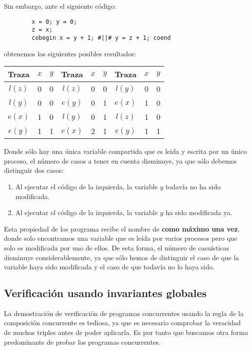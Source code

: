 \begin{ejemplo}
    Sin embargo, ante el siguiente código:
    \begin{verbatim}
        x = 0; y = 0;
        z = x;
        cobegin x = y + 1; #||# y = z + 1; coend
    \end{verbatim}
    obtenemos los siguientes posibles resultados:
    \begin{table}[H]
    \centering
    \begin{tabular}{|c|c|c||c|c|c||c|c|c|}
        \hline
        Traza & $x$ & $y$ &Traza & $x$ & $y$ &Traza & $x$ & $y$ \\
        \hline
        $l(z)$ & 0 & 0 & $l(z)$ & 0 & 0 & $l(y)$ & 0 & 0      \\
        \hline                                                        
        $l(y)$ & 0 & 0 & $e(y)$ & 0 & 1 & $e(x)$ & 1 & 0  \\
        \hline                                                            
        $e(x)$ & 1 & 0 & $l(y)$ & 0 & 1 & $l(z)$ & 1 & 0      \\
        \hline                                                            
        $e(y)$ & 1 & 1 & $e(x)$ & 2 & 1 & $e(y)$ & 1 & 1  \\
        \hline
    \end{tabular}
    \end{table}
    Donde sólo hay una única variable compartida que es leida y escrita por un único proceso, el número de casos a tener en cuenta disminuye, ya que sólo debemos distinguir dos casos:
    \begin{enumerate}
        \item Al ejecutar el código de la izquierda, la variable $y$ todavía no ha sido modificada.
        \item Al ejecutar el código de la izquierda, la variable $y$ ha sido modificada ya.
    \end{enumerate}
    Esta propiedad de los programa recibe el nombre de \textbf{como máximo una vez}, donde solo encontramos una variable que es leída por varios procesos pero que solo es modificada por uno de ellos. De esta forma, el número de casuísticas disminuye considerablemente, ya que sólo hemos de distinguir el caso de que la variable haya sido modificada y el caso de que todavía no lo haya sido.
\end{ejemplo}

\subsection{Verificación usando invariantes globales}
La demostración de verificación de programas concurrentes usando la regla de la composición concurrente es tediosa, ya que es necesario comprobar la veracidad de muchos triples antes de poder aplicarla. Es por tanto que buscamos otra forma predominante de probar los programas concurrentes.\\

